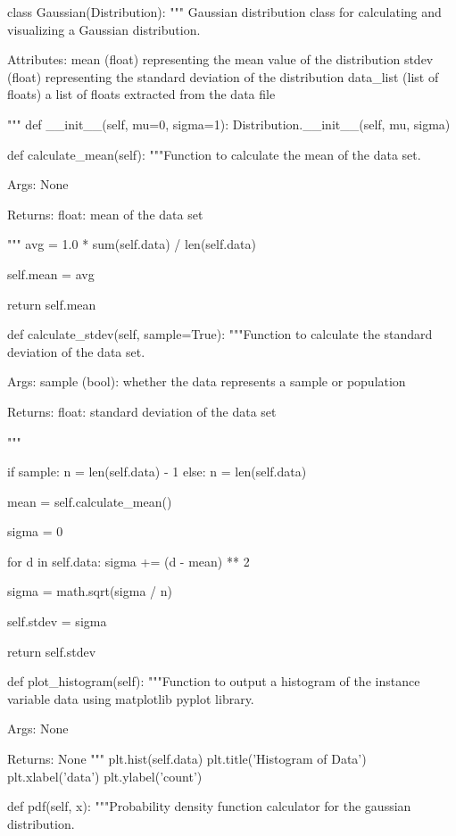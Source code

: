 \begin{python}
	class Gaussian(Distribution):
		""" Gaussian distribution class for calculating and 
		visualizing a Gaussian distribution.
		
		Attributes:
		mean (float) representing the mean value of the distribution
		stdev (float) representing the standard deviation of the distribution
		data_list (list of floats) a list of floats extracted from the data file
		
		"""
		def __init__(self, mu=0, sigma=1):
			Distribution.__init__(self, mu, sigma)
		
		def calculate_mean(self):
			"""Function to calculate the mean of the data set.
			
			Args: 
			None
			
			Returns: 
			float: mean of the data set
			
			"""
			avg = 1.0 * sum(self.data) / len(self.data)
			
			self.mean = avg
			
			return self.mean
		
		def calculate_stdev(self, sample=True):
			"""Function to calculate the standard deviation of the data set.
			
			Args: 
			sample (bool): whether the data represents a sample or population
			
			Returns: 
			float: standard deviation of the data set
			
			"""
			
			if sample:
			n = len(self.data) - 1
			else:
			n = len(self.data)
			
			mean = self.calculate_mean()
			
			sigma = 0
			
			for d in self.data:
			sigma += (d - mean) ** 2
			
			sigma = math.sqrt(sigma / n)
			
			self.stdev = sigma
			
			return self.stdev
		
		def plot_histogram(self):
			"""Function to output a histogram of the instance variable data using 
			matplotlib pyplot library.
			
			Args:
			None
			
			Returns:
			None
			"""
			plt.hist(self.data)
			plt.title('Histogram of Data')
			plt.xlabel('data')
			plt.ylabel('count')
		
		def pdf(self, x):
			"""Probability density function calculator for the gaussian distribution.
			

\end{python}
